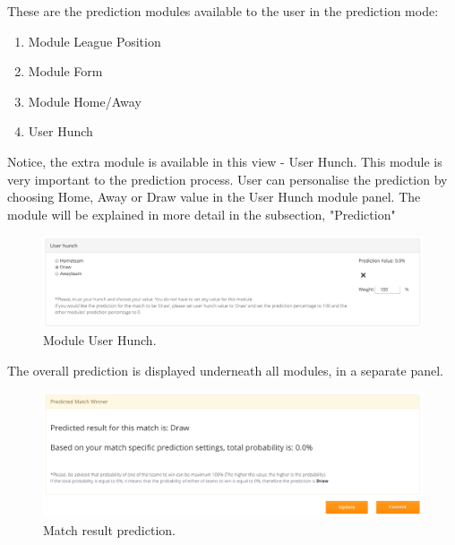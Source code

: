 These are the prediction modules available to the user in the prediction mode:

\begin{enumerate}
	\item Module League Position
	\item Module Form
	\item Module Home/Away
	\item User Hunch
\end{enumerate}

Notice, the extra module is available in this view - User Hunch. This module is very important to the prediction process. User can personalise the prediction by choosing Home, Away or Draw value in the User Hunch module panel. The module will be explained in more detail in the subsection, "Prediction" \cite{subsec:predictionimplementation}

\begin{figure}[H]
	\begin{center}
		\includegraphics[width=.90\linewidth,natwidth=610,natheight=642]{impl/images/userHunch}
		\caption{Module User Hunch.} \label{fig:using:userHunch}
	\end{center}
\end{figure}

The overall prediction is displayed underneath all modules, in a separate panel.

\begin{figure}[H]
	\begin{center}
		\includegraphics[width=.90\linewidth,natwidth=610,natheight=642]{impl/images/prediction}
		\caption{Match result prediction.} \label{fig:using:prediction}
	\end{center}
\end{figure}

